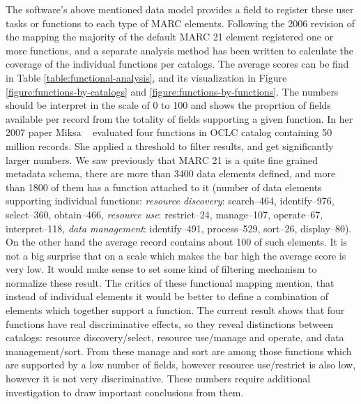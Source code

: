 The software's above mentioned data model provides a field to register these user tasks or functions to each type of MARC elements. Following the 2006 revision of the mapping the majority of the default MARC 21 element registered one or more functions, and a separate analysis method has been written to calculate the coverage of the individual functions per catalogs. The average scores can be find in Table \ref{table:functional-analysis}, and its visualization in Figure \ref{figure:functions-by-catalogs} and \ref{figure:functions-by-functions}. The numbers should be interpret in the scale of 0 to 100 and shows the proprtion of fields available per record from the totality of fields supporting a given function. In her 2007 paper Miksa ~\cite{miksa2007} evaluated four functions in OCLC catalog containing 50 million records. She applied a threshold to filter results, and get significantly larger numbers. We saw previously that MARC 21 is a quite fine grained metadata schema, there are more than 3400 data elements defined, and more than 1800 of them has a function attached to it (number of data elements supporting individual functions: \emph{resource discovery}: search--464, identify--976, select--360, obtain--466, \emph{resource use}: restrict--24, manage--107, operate--67, interpret--118, \emph{data management}: identify--491, process--529, sort--26, display--80). On the other hand the average record contains about 100 of such elements. It is not a big surprise that on a scale which makes the bar high the average score is very low. It would make sense to set some kind of filtering mechanism to normalize these result. The critics of these functional mapping \cite{miksa2007, harej2013} mention, that instead of individual elements it would be better to define a combination of elements which together support a function. The current result shows that four functions have real discriminative effects, so they reveal distinctions between catalogs: resource discovery/select, resource use/manage and operate, and data management/sort. From these manage and sort are among those functions which are supported by a low number of fields, however resource use/restrict is also low, however it is not very discriminative. These numbers require additional investigation to draw important conclusions from them.

